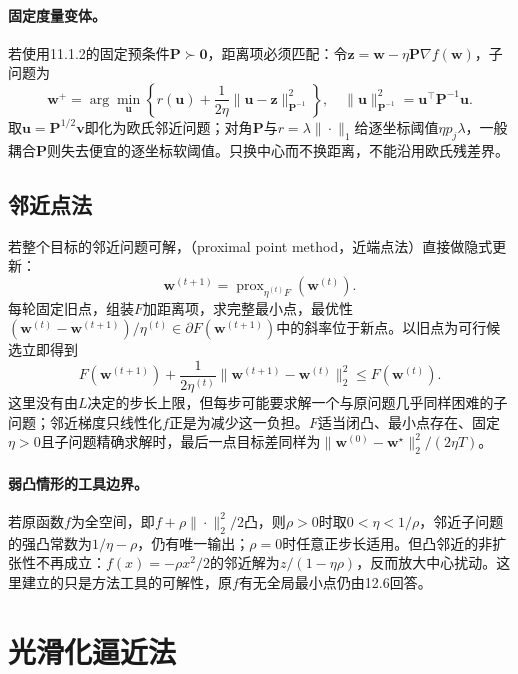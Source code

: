 \paragraph{固定度量变体。}
若使用11.1.2的固定预条件$\bm P\succ\bm0$，距离项必须匹配：令$\bm z=\bm w-\eta\bm P\nabla f(\bm w)$，子问题为
\[
 \bm w^+=\arg\min_{\bm u}\left\{
 r(\bm u)+\frac{1}{2\eta}\|\bm u-\bm z\|_{\bm P^{-1}}^2
 \right\},\quad
 \|\bm u\|_{\bm P^{-1}}^2=\bm u^\top\bm P^{-1}\bm u.
\]
取$\bm u=\bm P^{1/2}\bm v$即化为欧氏邻近问题；对角$\bm P$与$r=\lambda\|\cdot\|_1$给逐坐标阈值$\eta p_j\lambda$，一般耦合$\bm P$则失去便宜的逐坐标软阈值。只换中心而不换距离，不能沿用欧氏残差界。

\subsection{邻近点法}

若整个目标的邻近问题可解，（proximal point method，近端点法）直接做隐式更新：
\[
 \bm w^{(t+1)}
 =\operatorname{prox}_{\eta^{(t)}F}(\bm w^{(t)}).
\]
每轮固定旧点，组装$F$加距离项，求完整最小点，最优性$(\bm w^{(t)}-\bm w^{(t+1)})/\eta^{(t)}\in\partial F(\bm w^{(t+1)})$中的斜率位于新点。以旧点为可行候选立即得到
\[
 F(\bm w^{(t+1)})
 +\frac{1}{2\eta^{(t)}}\|\bm w^{(t+1)}-\bm w^{(t)}\|_2^2
 \leq F(\bm w^{(t)}).
\]
这里没有由$L$决定的步长上限，但每步可能要求解一个与原问题几乎同样困难的子问题；邻近梯度只线性化$f$正是为减少这一负担。$F$适当闭凸、最小点存在、固定$\eta>0$且子问题精确求解时，最后一点目标差同样为$\|\bm w^{(0)}-\bm w^\star\|_2^2/(2\eta T)$。

\paragraph{弱凸情形的工具边界。}
若原函数$f$为全空间，即$f+\rho\|\cdot\|_2^2/2$凸，则$\rho>0$时取$0<\eta<1/\rho$，邻近子问题的强凸常数为$1/\eta-\rho$，仍有唯一输出；$\rho=0$时任意正步长适用。但凸邻近的非扩张性不再成立：$f(x)=-\rho x^2/2$的邻近解为$z/(1-\eta\rho)$，反而放大中心扰动。这里建立的只是方法工具的可解性，原$f$有无全局最小点仍由12.6回答。

\section{光滑化逼近法}

